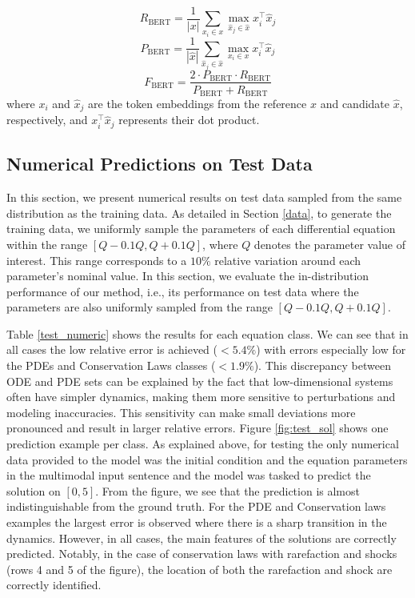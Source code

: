 \documentclass{article}
\begin{document}
\begin{enumerate}
\[
R_{\text{BERT}} = \frac{1}{|x|} \sum_{x_i \in x} \max_{\hat{x}_j \in \hat{x}} x_i^\top \hat{x}_j
\]
\[
P_{\text{BERT}} = \frac{1}{|\hat{x}|} \sum_{\hat{x}_j \in \hat{x}} \max_{x_i \in x} x_i^\top \hat{x}_j
\]
\[
F_{\text{BERT}} = \frac{2 \cdot P_{\text{BERT}} \cdot R_{\text{BERT}}}{P_{\text{BERT}} + R_{\text{BERT}}}
\]
where \(x_i\) and \(\hat{x}_j\) are the token embeddings from the reference \(x\) and candidate \(\hat{x}\), respectively, and \(x_i^\top \hat{x}_j\) represents their dot product.
\end{enumerate}

\subsection{Numerical Predictions on Test Data}\label{sec:test_numeric}
In this section, we present numerical results on test data sampled from the same distribution as the training data. As detailed in Section \ref{data}, to generate the training data, we uniformly sample the parameters of each differential equation within the range \([Q-0.1Q, Q+0.1Q]\), where \(Q\) denotes the parameter value of interest. This range corresponds to a \(10\%\) relative variation around each parameter's nominal value. In this section, we evaluate the in-distribution performance of our method, i.e., its performance on test data where the parameters are also uniformly sampled from the range \([Q-0.1Q, Q+0.1Q]\). 

Table \ref{test_numeric} shows the results for each equation class. We can see that in all cases the low relative error is achieved ($<5.4\%$) with errors especially low for the PDEs and Conservation Laws classes ($<1.9\%$). This discrepancy between ODE and PDE sets can be explained by the fact that low-dimensional systems often have simpler dynamics, making them more sensitive to perturbations and modeling inaccuracies. This sensitivity can make small deviations more pronounced and result in larger relative errors.
Figure \ref{fig:test_sol} shows one prediction example per class. As explained above, for testing the only numerical data provided to the model was the initial condition and the equation parameters in the multimodal input sentence and the model was tasked to predict the solution on $[0,5]$. From the figure, we see that the prediction is almost indistinguishable from the ground truth. For the PDE and Conservation laws examples the largest error is observed where there is a sharp transition in the dynamics. However, in all cases, the main features of the solutions are correctly predicted. Notably, in the case of conservation laws with rarefaction and shocks (rows 4 and 5 of the figure), the location of both the rarefaction and shock are correctly identified. 
\end{document}

